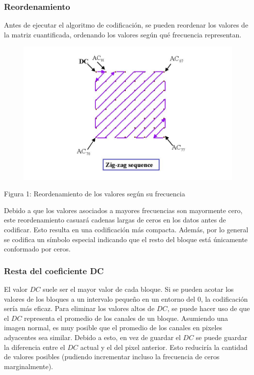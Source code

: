 \documentclass[%
final,
%
reprint,
%
notitlepage,
narroweqnarray,
inline,
twoside,
invited
]{ieee}
\begin{document}
\subsubsection{Reordenamiento}

\par Antes de ejecutar el algoritmo de codificación, se pueden reordenar los valores de la matriz cuantificada, 
ordenando los valores según qué frecuencia representan. 

\begin{figure}[H]
	\begin{center}
	\includegraphics[scale=0.5]{./img/zig-zag.jpg}
	\end{center}
\end{figure}
\begin{center}
\par Figura 1: Reordenamiento de los valores según su frecuencia
\end{center}

\par Debido a que los valores asociados a mayores frecuencias son mayormente cero, este reordenamiento casuará 
cadenas largas de ceros en los datos antes de codificar. Esto resulta en una codificación más compacta. Además, 
por lo general se codifica un símbolo especial indicando que el resto del bloque está únicamente conformado 
por ceros.

\subsubsection{Resta del coeficiente DC}

El valor $DC$ suele ser el mayor valor de cada bloque. Si se pueden acotar los valores de los bloques a un intervalo 
pequeño en un entorno del 0, la codificación sería más eficaz. Para eliminar los valores altos de $DC$, se puede hacer 
uso de que el $DC$ representa el promedio de los canales de un bloque. Asumiendo una imagen normal, es muy posible 
que el promedio de los canales en pixeles adyacentes sea similar. Debido a esto, en vez de guardar el $DC$ se puede 
guardar la diferencia entre el $DC$ actual y el del pixel anterior. Esto reduciría la cantidad de valores 
posibles (pudiendo incrementar incluso la frecuencia de ceros marginalmente).
\end{document}
